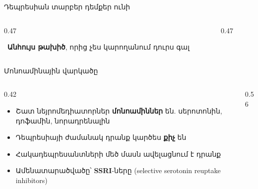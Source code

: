 \begin{frame}{Դեպրեսիան տարբեր դեմքեր ունի}
  \begin{columns}[T]
    \begin{column}{0.47\textwidth}
      \begin{card}[colback=lavender!35!cardwhite]\ \textbf{Անհույս թախիծ}, որից չես կարողանում դուրս գալ\end{card}
    \end{column}
    \begin{column}{0.47\textwidth}
    \end{column}
  \end{columns}
  \vspace{3mm}
\end{frame}

\begin{frame}{Մոնոամինային վարկածը}
  \begin{columns}[c]
    \begin{column}{0.42\textwidth}
      \begin{itemize}
        \item Շատ նեյրոմեդիատորներ \textbf{մոնոամիններ} են. սերոտոնին, դոֆամին, նորադրենալին
        \item Դեպրեսիայի ժամանակ դրանք կարծես \textbf{քիչ} են
        \item Հակադեպրեսանտների մեծ մասն ավելացնում է դրանք
        \item<2-> Ամենատարածվածը՝ \textbf{SSRI}-ները (selective serotonin reuptake inhibitors)
      \end{itemize}
    \end{column}
    \begin{column}{0.56\textwidth}
      \centering
      
    \end{column}
  \end{columns}
\end{frame}

